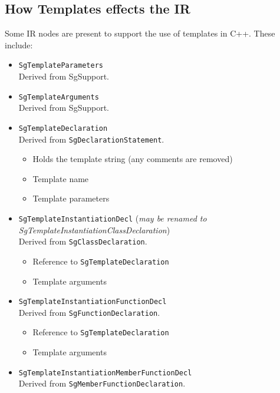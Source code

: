 \subsection{ How Templates effects the IR }
   Some IR nodes are present to support the use of templates in C++. These include:
\begin{itemize}
     \item {\tt SgTemplateParameters} \\
           Derived from SgSupport.

     \item {\tt SgTemplateArguments} \\
           Derived from SgSupport.

     \item {\tt SgTemplateDeclaration} \\
           Derived from {\tt SgDeclarationStatement}.
          \begin{itemize}
               \item Holds the template string (any comments are removed)
               \item Template name
               \item Template parameters
          \end{itemize}
     \item {\tt SgTemplateInstantiationDecl} ({\em may be renamed to SgTemplateInstantiationClassDeclaration}) \\
           Derived from {\tt SgClassDeclaration}.
          \begin{itemize}
               \item Reference to {\tt SgTemplateDeclaration}
               \item Template arguments
          \end{itemize}
     \item {\tt SgTemplateInstantiationFunctionDecl} \\
           Derived from {\tt SgFunctionDeclaration}.
          \begin{itemize}
               \item Reference to {\tt SgTemplateDeclaration}
               \item Template arguments
          \end{itemize}
     \item {\tt SgTemplateInstantiationMemberFunctionDecl} \\
           Derived from {\tt SgMemberFunctionDeclaration}.
          \begin{itemize}

\end{itemize}
\end{itemize}
